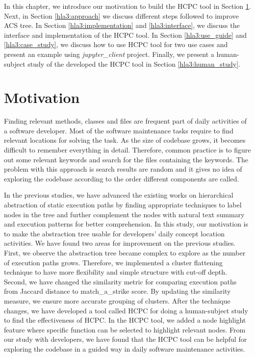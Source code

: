 \label{chapter:hla3}
In this chapter, we introduce our motivation to build the HCPC tool in Section \ref{hla3:motivation}. Next, in Section \ref{hla3:approach} we discuss different steps followed to improve ACS tree. In Section \ref{hla3:implementation} and \ref{hla3:interface}, we discuss the interface and implementation of the HCPC tool. In Section \ref{hla3:use_guide} and \ref{hla3:case_study}, we discuss how to use HCPC tool for two use cases and present an example using \emph{jupyter\_client} project. Finally, we present a  human-subject study of the developed the HCPC tool in Section \ref{hla3:human_study}.

\section{Motivation}
\label{hla3:motivation}
Finding relevant methods, classes and files are frequent part of daily activities of a software developer. Most of the software maintenance tasks require to find relevant locations for solving the task. As the size of codebase grows, it becomes difficult to remember everything in detail. Therefore, common practice is to figure out some relevant keywords and search for the files containing the keywords. The problem with this approach is search results are random and it gives no idea of exploring the codebase according to the order different components are called.

In the previous studies, we have advanced the existing works on hierarchical abstraction of static execution paths by finding appropriate techniques to label nodes in the tree and further complement the nodes with natural text summary and execution patterns for better comprehension. In this study, our motivation is to make the abstraction tree usable for developers' daily concept location activities. We have found two areas for improvement on the previous studies. First, we observe the abstraction tree became complex to explore as the number of execution paths grows. Therefore, we implemented a cluster flattening technique to have more flexibility and simple structure with cut-off depth. Second, we have changed the similarity metric for comparing execution paths from Jaccard distance to match\_a\_strike score. By updating the similarity measure, we ensure more accurate grouping of clusters. After the technique changes, we have developed a tool called HCPC for doing a human-subject study to find the effectiveness of HCPC. In the HCPC tool, we added a node highlight feature where specific function can be selected to highlight relevant nodes. From our study with developers, we have found that the HCPC tool can be helpful for exploring the codebase in a guided way in daily software maintenance activities. 



